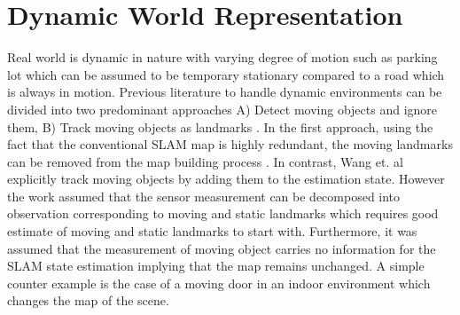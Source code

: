 \documentclass[conference]{IEEEtran}
\begin{document}




\section{Dynamic World Representation} Real world is dynamic in nature with varying degree of motion such as parking lot which can be assumed to be temporary stationary compared to a road which is always in motion. Previous literature to handle dynamic environments can be divided into two predominant approaches A) Detect moving objects and ignore them, B) Track moving objects as landmarks  \cite{bailey2006simultaneous}. In the first approach, using the fact that the conventional SLAM map is highly redundant, the moving landmarks can be removed from the map building process \cite{bailey2002mobile}. In contrast, Wang et. al \cite{wang2003online} explicitly track moving objects by adding them to the estimation state. However the work assumed that the sensor measurement can be decomposed into observation corresponding to moving and static landmarks which requires good estimate of moving and static landmarks to start with. Furthermore, it was assumed that the measurement of moving object carries no information for the SLAM state estimation implying that the map remains unchanged. A simple counter example is the case of a moving door in an indoor environment which changes the map of the scene.
\end{document}
